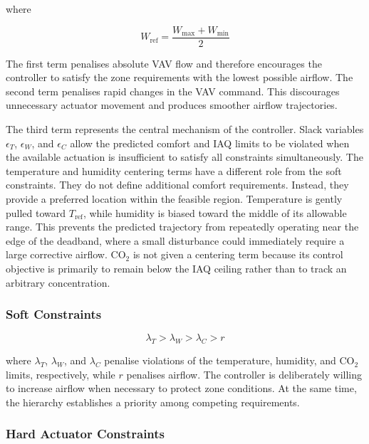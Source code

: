 \documentclass[12pt, a4paper]{article}
\begin{document}
	
	where
	
	\begin{equation}
		W_{\mathrm{ref}} = 	\frac{W_{\max}+W_{\min}}{2}
	\end{equation}
	
	The first term penalises absolute VAV flow and therefore encourages the controller to satisfy the zone requirements with the lowest possible airflow. The second term penalises rapid changes in the VAV command. This discourages unnecessary actuator movement and produces smoother airflow trajectories.
	
	The third term represents the central mechanism of the controller. Slack variables $\epsilon_T$, $\epsilon_W$, and $\epsilon_C$ allow the predicted comfort and IAQ limits to be violated when the available actuation is insufficient to satisfy all constraints simultaneously.  The temperature and humidity centering terms have a different role from the soft constraints. They do not define additional comfort requirements. Instead, they provide a preferred location within the feasible region. Temperature is gently pulled toward $T_{\mathrm{ref}}$, while humidity is biased toward the middle of its allowable range. This prevents the predicted trajectory from repeatedly operating near the edge of the deadband, where a small disturbance could immediately require a large corrective airflow. CO$_2$ is not given a centering term because its control objective is primarily to remain below the IAQ ceiling rather than to track an arbitrary concentration.
	
	
	\subsubsection{Soft Constraints}
	
	\begin{equation}
		\lambda_T > \lambda_W > \lambda_C >  r 
	\end{equation}
	
	where $\lambda_T$, $\lambda_W$, and $\lambda_C$ penalise violations of the temperature, humidity, and CO$_2$ limits, respectively, while $r$ penalises airflow. The controller is deliberately willing to increase airflow when necessary to protect zone conditions. At the same time, the hierarchy establishes a priority among competing requirements.
	\subsubsection{Hard Actuator Constraints}
	
\end{document}
